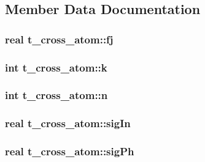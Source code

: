 \subsection{\-Member \-Data \-Documentation}
\hypertarget{structt__cross__atom_ab59d8a5a75152d91378e44abc69d5bf4}{
\subsubsection[{fj}]{\setlength{\rightskip}{0pt plus 5cm}real {\bf t\-\_\-cross\-\_\-atom\-::fj}}}\label{structt__cross__atom_ab59d8a5a75152d91378e44abc69d5bf4}
\hypertarget{structt__cross__atom_ae839b46f46da0b21bd3468a52c9a5fe7}{
\subsubsection[{k}]{\setlength{\rightskip}{0pt plus 5cm}int {\bf t\-\_\-cross\-\_\-atom\-::k}}}\label{structt__cross__atom_ae839b46f46da0b21bd3468a52c9a5fe7}
\hypertarget{structt__cross__atom_a413528946236befa7fd1eb4edeeb24e7}{
\subsubsection[{n}]{\setlength{\rightskip}{0pt plus 5cm}int {\bf t\-\_\-cross\-\_\-atom\-::n}}}\label{structt__cross__atom_a413528946236befa7fd1eb4edeeb24e7}
\hypertarget{structt__cross__atom_a5a3f2655034ee147b8b5998d9795eca6}{
\subsubsection[{sig\-In}]{\setlength{\rightskip}{0pt plus 5cm}real {\bf t\-\_\-cross\-\_\-atom\-::sig\-In}}}\label{structt__cross__atom_a5a3f2655034ee147b8b5998d9795eca6}
\hypertarget{structt__cross__atom_a2e689e95b037415137bbca88432c1fc4}{
\subsubsection[{sig\-Ph}]{\setlength{\rightskip}{0pt plus 5cm}real {\bf t\-\_\-cross\-\_\-atom\-::sig\-Ph}}}\label{structt__cross__atom_a2e689e95b037415137bbca88432c1fc4}
